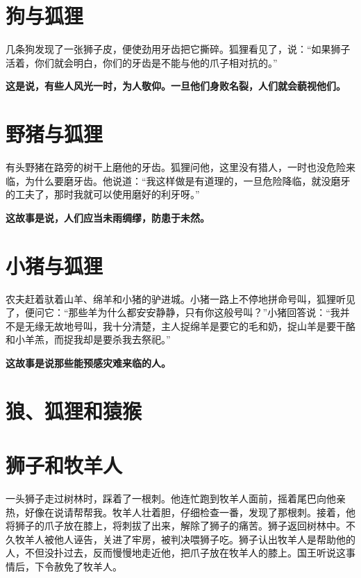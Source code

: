 \section{狗与狐狸}

几条狗发现了一张狮子皮，便使劲用牙齿把它撕碎。狐狸看见了，说：“如果狮子活着，你们就会明白，你们的牙齿是不能与他的爪子相对抗的。”

{\bfseries \color{red}这是说，有些人风光一时，为人敬仰。一旦他们身败名裂，人们就会藐视他们。}

\section{野猪与狐狸}

有头野猪在路旁的树干上磨他的牙齿。狐狸问他，这里没有猎人，一时也没危险来临，为什么要磨牙齿。他说道：“我这样做是有道理的，一旦危险降临，就没磨牙的工夫了，那时我就可以使用磨好的利牙呀。”

{\bfseries \color{red}这故事是说，人们应当未雨绸缪，防患于未然。}

\section{小猪与狐狸}

农夫赶着驮着山羊、绵羊和小猪的驴进城。小猪一路上不停地拼命号叫，狐狸听见了，便问它：“那些羊为什么都安安静静，只有你这般号叫？”小猪回答说：“我并不是无缘无故地号叫，我十分清楚，主人捉绵羊是要它的毛和奶，捉山羊是要干酪和小羊羔，而捉我却是要杀我去祭祀。”

{\bfseries \color{red}这故事是说那些能预感灾难来临的人。}

\section{狼、狐狸和猿猴}



{\bfseries \color{red}}

\section{狮子和牧羊人}

一头狮子走过树林时，踩着了一根刺。他连忙跑到牧羊人面前，摇着尾巴向他亲热，好像在说请帮帮我。牧羊人壮着胆，仔细检查一番，发现了那根刺。接着，他将狮子的爪子放在膝上，将刺拔了出来，解除了狮子的痛苦。狮子返回树林中。不久牧羊人被他人诬告，关进了牢房，被判决喂狮子吃。狮子认出牧羊人是帮助他的人，不但没扑过去，反而慢慢地走近他，把爪子放在牧羊人的膝上。国王听说这事情后，下令赦免了牧羊人。

